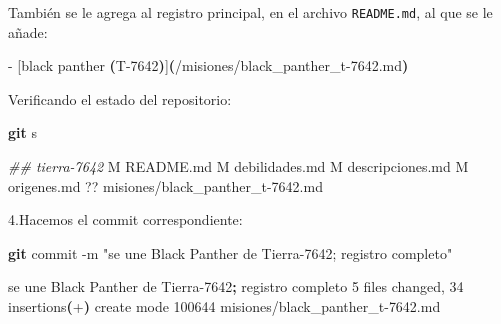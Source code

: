 \documentclass[
]{book}
\newenvironment{Shaded}{\begin{snugshade}}{\end{snugshade}}
\newcommand{\AttributeTok}[1]{\textcolor[rgb]{0.13,0.29,0.53}{#1}}
\newcommand{\CommentTok}[1]{\textcolor[rgb]{0.56,0.35,0.01}{\textit{#1}}}
\newcommand{\ErrorTok}[1]{\textcolor[rgb]{0.64,0.00,0.00}{\textbf{#1}}}
\newcommand{\ExtensionTok}[1]{#1}
\newcommand{\FunctionTok}[1]{\textcolor[rgb]{0.13,0.29,0.53}{\textbf{#1}}}
\newcommand{\KeywordTok}[1]{\textcolor[rgb]{0.13,0.29,0.53}{\textbf{#1}}}
\newcommand{\NormalTok}[1]{#1}
\newcommand{\StringTok}[1]{\textcolor[rgb]{0.31,0.60,0.02}{#1}}
\begin{document}
También se le agrega al registro principal, en el archivo \texttt{README.md}, al que se le añade:

\begin{Shaded}
\begin{Highlighting}[]
  \ExtensionTok{{-}}\NormalTok{ [black panther }\ErrorTok{(}\ExtensionTok{T{-}7642}\KeywordTok{)}\ExtensionTok{]}\ErrorTok{(}\ExtensionTok{/misiones/black\_panther\_t{-}7642.md}\KeywordTok{)}
\end{Highlighting}
\end{Shaded}

Verificando el estado del repositorio:

\begin{Shaded}
\begin{Highlighting}[]
\FunctionTok{git}\NormalTok{ s}
\end{Highlighting}
\end{Shaded}

\begin{Shaded}
\begin{Highlighting}[]
\CommentTok{\#\# tierra{-}7642}
 \ExtensionTok{M}\NormalTok{ README.md}
 \ExtensionTok{M}\NormalTok{ debilidades.md}
 \ExtensionTok{M}\NormalTok{ descripciones.md}
 \ExtensionTok{M}\NormalTok{ origenes.md}
\ExtensionTok{??}\NormalTok{ misiones/black\_panther\_t{-}7642.md}
\end{Highlighting}
\end{Shaded}

4.Hacemos el commit correspondiente:

\begin{Shaded}
\begin{Highlighting}[]
\FunctionTok{git}\NormalTok{ commit }\AttributeTok{{-}m} \StringTok{"se une Black Panther de Tierra{-}7642; registro completo"}
\end{Highlighting}
\end{Shaded}

\begin{Shaded}
\begin{Highlighting}[]
\ExtensionTok{[tierra{-}7642}\NormalTok{ 347dd3f] se une Black Panther de Tierra{-}7642}\KeywordTok{;} \ExtensionTok{registro}\NormalTok{ completo}
 \ExtensionTok{5}\NormalTok{ files changed, 34 insertions}\ErrorTok{(}\ExtensionTok{+}\KeywordTok{)}
 \ExtensionTok{create}\NormalTok{ mode 100644 misiones/black\_panther\_t{-}7642.md}
\end{Highlighting}
\end{Shaded}
\end{document}
